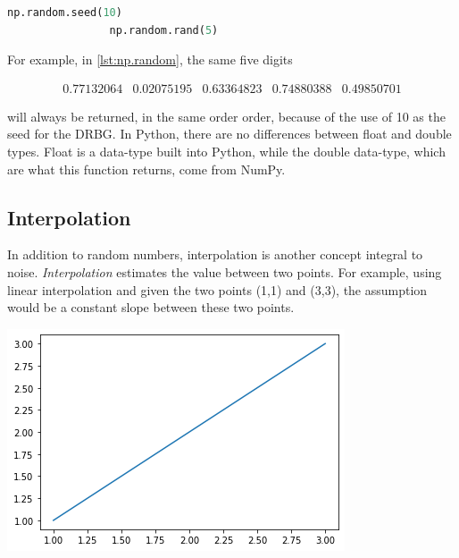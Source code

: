 \documentclass[10pt]{report}
\begin{document}
			\begin{lstlisting}[label={lst:np.random}, language=Python, frame=none, caption={An example of seeding NumPy's random function in Python.}, captionpos=b]				
				np.random.seed(10)
				np.random.rand(5)
			\end{lstlisting}
			
			For example, in \autoref{lst:np.random}, the same five digits 
			
			$$ \begin{matrix}
				0.77132064 & 
				0.02075195 & 
				0.63364823 & 
				0.74880388 & 
				0.49850701
			\end{matrix} $$
			
			will always be returned, in the same order order, because of the use of 10 as the seed for the DRBG. In Python, there are no differences between float and double types. Float is a data-type built into Python, while the double data-type, which are what this function returns, come from NumPy.
			
			\subsection{Interpolation} \label{subsec:interpolation}
			
			In addition to random numbers, interpolation is another concept integral to noise. \emph{Interpolation} estimates the value between two points. For example, using linear interpolation and given the two points (1,1) and (3,3), the assumption would be a constant slope between these two points. 
			
			\begin{minipage}{\textwidth}
				\centering
				\includegraphics[scale=.5]{linear-interpolation}
				\label{fig:linear-interpolation}
			\end{minipage}
			
\end{document}
